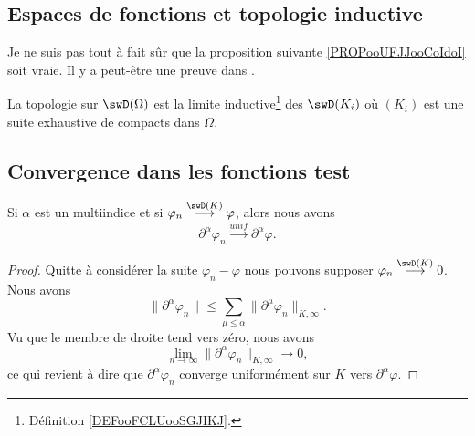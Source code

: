 \subsection{Espaces de fonctions et topologie inductive}

\begin{probleme}		\label{PROBooQXUDooJwnzpn}
	Je ne suis pas tout à fait sûr que la proposition suivante \ref{PROPooUFJJooCoIdoI} soit vraie. Il y a peut-être une preuve dans \cite{TQSWRiz}.
\end{probleme}

\begin{proposition}		\label{PROPooUFJJooCoIdoI}
	La topologie sur \( \swD(\Omega)\) est la limite inductive\footnote{Définition \ref{DEFooFCLUooSGJIKJ}.} des \( \swD(K_i)\) où \( (K_i)\) est une suite exhaustive de compacts dans \( \Omega\).
\end{proposition}

\subsection{Convergence dans les fonctions test}

\begin{lemma}    \label{LemXXwDjui}
	Si \( \alpha\) est un multiindice et si \( \varphi_n\stackrel{\swD(K)}{\longrightarrow}\varphi\), alors nous avons
	\begin{equation}
		\partial^{\alpha}\varphi_n\stackrel{unif}{\longrightarrow}\partial^{\alpha}\varphi.
	\end{equation}
\end{lemma}

\begin{proof}
	Quitte à considérer la suite \( \varphi_n-\varphi\) nous pouvons supposer \( \varphi_n\stackrel{\swD(K)}{\longrightarrow}0\). Nous avons
	\begin{equation}
		\| \partial^{\alpha}\varphi_n \|\leq \sum_{\mu\leq\alpha}\| \partial^{\mu}\varphi_n \|_{K,\infty}.
	\end{equation}
	Vu que le membre de droite tend vers zéro, nous avons
	\begin{equation}
		\lim_{n\to \infty} \| \partial^{\alpha}\varphi_n \|_{K,\infty}\to 0,
	\end{equation}
	ce qui revient à dire que \( \partial^{\alpha}\varphi_n\) converge uniformément sur \( K\) vers \( \partial^{\alpha}\varphi\).
\end{proof}

